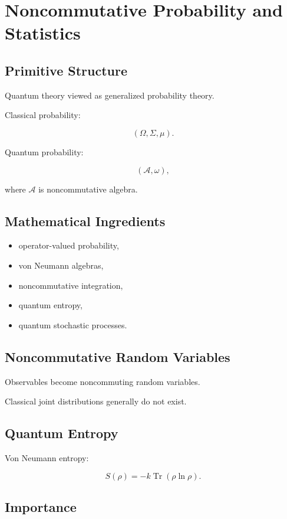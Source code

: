 \documentclass[11pt]{article}
\begin{document}
\section{Noncommutative Probability and Statistics}

\subsection{Primitive Structure}

Quantum theory viewed as generalized probability theory.

Classical probability:

\[
(\Omega,\Sigma,\mu).
\]

Quantum probability:

\[
(\mathcal A,\omega),
\]

where $\mathcal A$ is noncommutative algebra.

\subsection{Mathematical Ingredients}

\begin{itemize}
\item operator-valued probability,
\item von Neumann algebras,
\item noncommutative integration,
\item quantum entropy,
\item quantum stochastic processes.
\end{itemize}

\subsection{Noncommutative Random Variables}

Observables become noncommuting random variables.

Classical joint distributions generally do not exist.

\subsection{Quantum Entropy}

Von Neumann entropy:

\[
S(\rho)
=
-k \operatorname{Tr}(\rho \ln \rho).
\]

\subsection{Importance}
\end{document}
